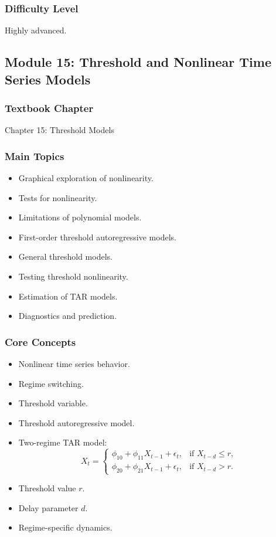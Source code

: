 \documentclass[11pt]{article}
\begin{document}
\subsubsection*{Difficulty Level}
Highly advanced.

\subsection{Module 15: Threshold and Nonlinear Time Series Models}

\subsubsection*{Textbook Chapter}
Chapter 15: Threshold Models

\subsubsection*{Main Topics}
\begin{itemize}
    \item Graphical exploration of nonlinearity.
    \item Tests for nonlinearity.
    \item Limitations of polynomial models.
    \item First-order threshold autoregressive models.
    \item General threshold models.
    \item Testing threshold nonlinearity.
    \item Estimation of TAR models.
    \item Diagnostics and prediction.
\end{itemize}

\subsubsection*{Core Concepts}
\begin{itemize}
    \item Nonlinear time series behavior.
    \item Regime switching.
    \item Threshold variable.
    \item Threshold autoregressive model.
    \item Two-regime TAR model:
    \[
        X_t =
        \begin{cases}
            \phi_{10} + \phi_{11}X_{t-1} + \epsilon_t,
            & \text{if } X_{t-d} \leq r, \\
            \phi_{20} + \phi_{21}X_{t-1} + \epsilon_t,
            & \text{if } X_{t-d} > r.
        \end{cases}
    \]
    \item Threshold value $r$.
    \item Delay parameter $d$.
    \item Regime-specific dynamics.
\end{itemize}
\end{document}
